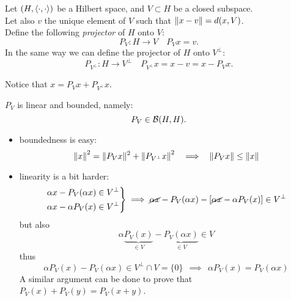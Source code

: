 \begin{defn}
	Let $(H, \left\langle\cdot, \cdot\right\rangle)$ be a Hilbert space, and $V \subset H$ be a closed subspace.\\
	Let also $v$ the unique element of $V$ such that $\left\lVert x-v\right\rVert = d(x, V)$.\\
	Define the following \emph{projector} of $H$ onto $V$:
	$$P_V : H \to V  \quad P_V x = v.$$
	In the same way we can define the projector of $H$ onto $V^\perp$:
	$$P_{V^\perp}: H \to V^\perp \quad P_{V^\perp} x = x-v = x - P_V x.$$
\end{defn}
Notice that $x = P_V x + P_{V^\perp} x$.

$P_V$ is linear and bounded, namely: $$P_V \in \mathcal B(H, H).$$

\begin{itemize}
\item boundedness is easy:
$$
	\norm{x}^2 =\Vert P_V x\Vert^2 +\norm{P_{V^{\perp}} x}^2 \ \ \implies  \ \ \norm{P_V x} \leq \norm{x} 
$$
\item linearity is a bit harder:
$$
	\begin{drcases}
	\alpha x-P_V( \alpha x) \in V^{\perp}\\
	\alpha x-\alpha P_V(x) \in V^{\perp}
	\end{drcases}
	\implies \cancel{\alpha x}-P_V( \alpha x) -[\cancel{\alpha x} -\alpha P_V(x)] \in V^{\perp}
$$
but also
$$
	\alpha \underbrace{P_V(x)}_{\in V} -\underbrace{P_V( \alpha x)}_{\in V} \in V
$$
thus
$$
	\alpha P_V(x) -P_V( \alpha x) \in V^{\perp} \cap V=\{0\} \ \ \implies  \ \ \alpha P_V(x) =P_V( \alpha x)
$$
A similar argument can be done to prove that $P_V(x) +P_V(y) =P_V(x+y)$.
\end{itemize}

